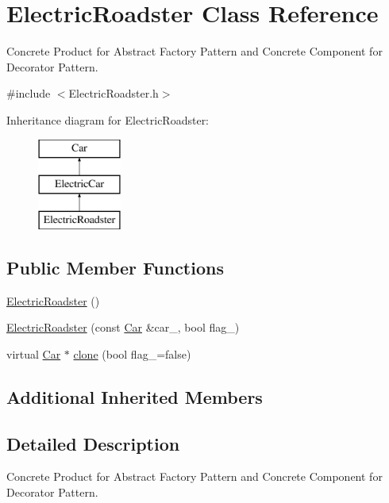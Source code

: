 \hypertarget{class_electric_roadster}{}\section{Electric\+Roadster Class Reference}
\label{class_electric_roadster}


Concrete Product for Abstract Factory Pattern and Concrete Component for Decorator Pattern.  




{\ttfamily \#include $<$Electric\+Roadster.\+h$>$}

Inheritance diagram for Electric\+Roadster\+:\begin{figure}[H]
\begin{center}
\leavevmode
\includegraphics[height=3.000000cm]{class_electric_roadster}
\end{center}
\end{figure}
\subsection*{Public Member Functions}
\begin{DoxyCompactItemize}
\item 
\mbox{\hyperlink{class_electric_roadster_a3fc84d2d94078f67a1da29fd4be0fe0e}{Electric\+Roadster}} ()
\item 
\mbox{\hyperlink{class_electric_roadster_a4d5d496f3f7ec8dd9832c2a40382ffc9}{Electric\+Roadster}} (const \mbox{\hyperlink{class_car}{Car}} \&car\+\_\+, bool flag\+\_\+)
\item 
virtual \mbox{\hyperlink{class_car}{Car}} $\ast$ \mbox{\hyperlink{class_electric_roadster_a4ef7c42355752e28cd2ad97ed1efc047}{clone}} (bool flag\+\_\+=false)
\end{DoxyCompactItemize}
\subsection*{Additional Inherited Members}


\subsection{Detailed Description}
Concrete Product for Abstract Factory Pattern and Concrete Component for Decorator Pattern. 


